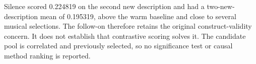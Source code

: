 Silence scored 0.224819 on the second new description and had a two-new-description mean of 0.195319, above the warm baseline and close to several musical selections. The follow-on therefore retains the original construct-validity concern. It does not establish that contrastive scoring solves it. The candidate pool is correlated and previously selected, so no significance test or causal method ranking is reported.
